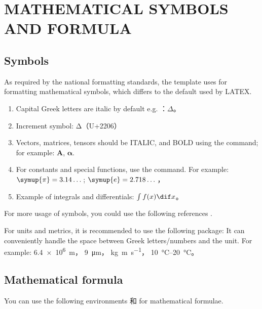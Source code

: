 
\chapter{MATHEMATICAL SYMBOLS AND FORMULA}

\section{Symbols}

As required by the national formatting standards, the template uses  for formatting mathematical symbols, which differs to the default used by LATEX. 

\begin{enumerate}
  \item Capital Greek letters are italic by default e.g. ：$\Delta$。
  \item Increment symbol: $\increment$（U+2206）
  \item Vectors, matrices, tensors should be ITALIC, and BOLD using the  command; for example: $\symbf{A}$, $\symbf{\alpha}$.
  \item For constants and special functions, use the  command. For example:
    $\symup{\pi} = 3.14\dots$; $\symup{e} = 2.718\dots$，
  \item Example of integrals and differentials: $\int f(x) \dif x$。
\end{enumerate}

For more usage of symbols, you could use the following references
\href{http://mirrors.ctan.org/macros/latex/contrib/unicode-math/unicode-math.pdf}{}
\href{http://mirrors.ctan.org/macros/latex/contrib/unicode-math/unimath-symbols.pdf}{}.

For units and metrics, it is recommended to use the following package:
\href{http://mirrors.ctan.org/macros/latex/contrib/siunitx/siunitx.pdf}{}
It can conveniently handle the space between Greek letters/numbers and the unit. For example:
\SI{6.4e6}{m}，
\SI{9}{\micro\meter}，
\si{kg.m.s^{-1}}，
\SIrange{10}{20}{\degreeCelsius}。



\section{Mathematical formula}

You can use the following environments  和  for mathematical formulae.


